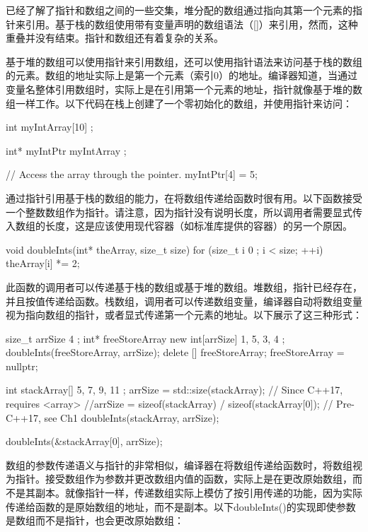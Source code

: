 
已经了解了指针和数组之间的一些交集，堆分配的数组通过指向其第一个元素的指针来引用。基于栈的数组使用带有变量声明的数组语法（[]）来引用，然而，这种重叠并没有结束。指针和数组还有着复杂的关系。


基于堆的数组可以使用指针来引用数组，还可以使用指针语法来访问基于栈的数组的元素。数组的地址实际上是第一个元素（索引0）的地址。编译器知道，当通过变量名整体引用数组时，实际上是在引用第一个元素的地址，指针就像基于堆的数组一样工作。以下代码在栈上创建了一个零初始化的数组，并使用指针来访问：

\begin{cpp}
int myIntArray[10] {};

int* myIntPtr { myIntArray };

// Access the array through the pointer.
myIntPtr[4] = 5;
\end{cpp}

通过指针引用基于栈的数组的能力，在将数组传递给函数时很有用。以下函数接受一个整数数组作为指针。请注意，因为指针没有说明长度，所以调用者需要显式传入数组的长度，这是应该使用现代容器（如标准库提供的容器）的另一个原因。

\begin{cpp}
void doubleInts(int* theArray, size_t size)
{
    for (size_t i { 0 }; i < size; ++i) { theArray[i] *= 2; }
}
\end{cpp}

此函数的调用者可以传递基于栈的数组或基于堆的数组。堆数组，指针已经存在，并且按值传递给函数。栈数组，调用者可以传递数组变量，编译器自动将数组变量视为指向数组的指针，或者显式传递第一个元素的地址。以下展示了这三种形式：

\begin{cpp}
size_t arrSize { 4 };
int* freeStoreArray { new int[arrSize]{ 1, 5, 3, 4 } };
doubleInts(freeStoreArray, arrSize);
delete [] freeStoreArray;
freeStoreArray = nullptr;

int stackArray[] { 5, 7, 9, 11 };
arrSize = std::size(stackArray); // Since C++17, requires <array>
//arrSize = sizeof(stackArray) / sizeof(stackArray[0]); // Pre-C++17, see Ch1
doubleInts(stackArray, arrSize);

doubleInts(&stackArray[0], arrSize);
\end{cpp}

数组的参数传递语义与指针的非常相似，编译器在将数组传递给函数时，将数组视为指针。接受数组作为参数并更改数组内值的函数，实际上是在更改原始数组，而不是其副本。就像指针一样，传递数组实际上模仿了按引用传递的功能，因为实际传递给函数的是原始数组的地址，而不是副本。以下doubleInts()的实现即使参数是数组而不是指针，也会更改原始数组：

